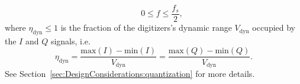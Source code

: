 \begin{itemize}
\begin{equation}
      \qquad
      0 \leq f \leq \frac{f_s}{2},
      \label{eq:DesignConsiderations:summary:quantization_noise_autospectral_density}
    \end{equation}
    where $\eta_{\text{dyn}} \leq 1$ is the fraction
    of the digitizers's dynamic range $V_{\text{dyn}}$
    occupied by the $I$ and $Q$ signals, i.e.\
    \begin{equation}
      \eta_{\text{dyn}}
      =
      \frac{\text{max}(I) - \text{min}(I)}{V_{\text{dyn}}}
      =
      \frac{\text{max}(Q) - \text{min}(Q)}{V_{\text{dyn}}}.
      \label{eq:DesignConsiderations:summary:eta_dynamic}
    \end{equation}
    See Section~\ref{sec:DesignConsiderations:quantization}
    for more details.
\end{itemize}




